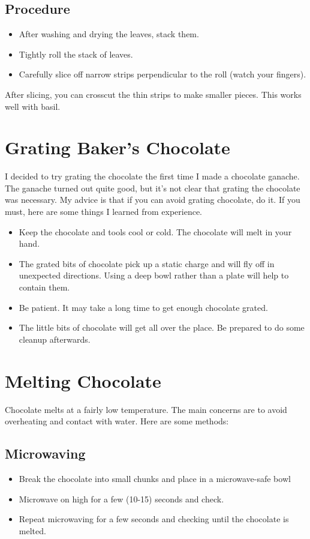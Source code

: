 \documentclass[10pt, openany]{book}
\begin{document}
\subsection{Procedure}
\begin{itemize}
  \item After washing and drying the leaves, stack them.
  \item Tightly roll the stack of leaves.
  \item Carefully slice off narrow strips perpendicular to the roll (watch your fingers).
\end{itemize}
After slicing, you can crosscut the thin strips to make smaller pieces.  This works well with basil.

\section{Grating Baker's Chocolate}
\label{tip:GrateChocolate}
I decided to try grating the chocolate the first time I made a chocolate ganache.  The ganache turned out quite good, but it's not clear that grating the chocolate was necessary.  My advice is that if you can avoid grating chocolate, do it.  If you must, here are some things I learned from experience.
\begin{itemize}
  \item Keep the chocolate and tools cool or cold.  The chocolate will melt in your hand.
  \item The grated bits of chocolate pick up a static charge and will fly off in unexpected directions.  Using a deep bowl rather than a plate will help to contain them.
  \item Be patient.  It may take a long time to get enough chocolate grated.
  \item The little bits of chocolate will get all over the place.  Be prepared to do some cleanup afterwards.
\end{itemize}

\section{Melting Chocolate}
\label{tip:MeltChocolate}
Chocolate melts at a fairly low temperature.  The main concerns are to avoid overheating and contact with water.  Here are some methods:
\subsection{Microwaving}
\begin{itemize}
  \item Break the chocolate into small chunks and place in a microwave-safe bowl
  \item Microwave on high for a few (10-15) seconds and check.
  \item Repeat microwaving for a few seconds and checking until the chocolate is melted.
\end{itemize}
\end{document}
